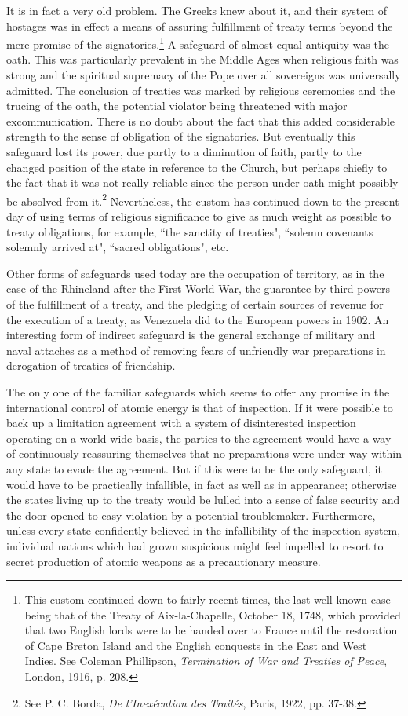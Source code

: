 \begin{introduction}
It is in fact a very old problem. The Greeks knew about it, and their system of hostages was in effect a means of assuring fulfillment of treaty terms beyond the mere promise of the signatories.\footnote{This custom continued down to fairly recent times, the last well-known case being that of the Treaty of Aix-la-Chapelle, October 18, 1748, which provided that two English lords were to be handed over to France until the restoration of Cape Breton Island and the English conquests in the East and West Indies. See Coleman Phillipson, \textit{Termination of War and Treaties of Peace}, London, 1916, p. 208.} A safeguard of almost equal antiquity was the oath. This was particularly prevalent in the Middle Ages when religious faith was strong and the spiritual supremacy of the Pope over all sovereigns was universally admitted. The conclusion of treaties was marked by religious ceremonies and the trucing of the oath, the potential violator being threatened with major excommunication. There is no doubt about the fact that this added considerable strength to the sense of obligation of the signatories. But eventually this safeguard lost its power, due partly to a diminution of faith, partly to the changed position of the state in reference to the Church, but perhaps chiefly to the fact that it was not really reliable since the person under oath might possibly be absolved from it.\footnote{See P. C. Borda, \textit{De l'Inex\'ecution des Trait\'es}, Paris, 1922, pp. 37-38.} Nevertheless, the custom has continued down to the present day of using terms of religious significance to give as much weight as possible to treaty obligations, for example, ``the sanctity of treaties", ``solemn covenants solemnly arrived at", ``sacred obligations", etc.

Other forms of safeguards used today are the occupation of territory, as in the case of the Rhineland after the First World War, the guarantee by third powers of the fulfillment of a treaty, and the pledging of certain sources of revenue for the execution of a treaty, as Venezuela did to the European powers in 1902. An interesting form of indirect safeguard is the general exchange of military and naval attaches as a method of removing fears of unfriendly war preparations in derogation of treaties of friendship.

The only one of the familiar safeguards which seems to offer any promise in the international control of atomic energy is that of inspection. If it were possible to back up a limitation agreement with a system of disinterested inspection operating on a world-wide basis, the parties to the agreement would have a way of continuously reassuring themselves that no preparations were under way within any state to evade the agreement. But if this were to be the only safeguard, it would have to be practically infallible, in fact as well as in appearance; otherwise the states living up to the treaty would be lulled into a sense of false security and the door opened to easy violation by a potential troublemaker. Furthermore, unless every state confidently believed in the infallibility of the inspection system, individual nations which had grown suspicious might feel impelled to resort to secret production of atomic weapons as a precautionary measure.


\end{introduction}
